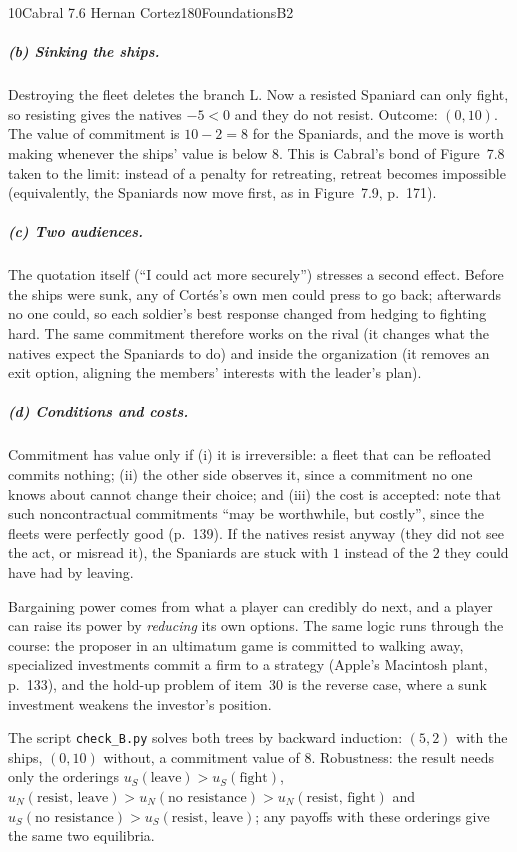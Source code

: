 \begin{exsol}{10}{Cabral 7.6 Hernan Cortez}{180}{Foundations}{B2}
\subparagraph{(b) Sinking the ships.} Destroying the fleet deletes the branch L. Now a resisted
Spaniard can only fight, so resisting gives the natives $-5 < 0$ and they do not resist.
Outcome: $(0,10)$. The value of commitment is $10 - 2 = 8$ for the Spaniards, and the move is
worth making whenever the ships' value is below $8$. This is Cabral's bond of Figure~7.8 taken to
the limit: instead of a penalty for retreating, retreat becomes impossible (equivalently, the
Spaniards now move first, as in Figure~7.9, p.~171).

\subparagraph{(c) Two audiences.} The quotation itself (``I could act more securely'') stresses
a second effect. Before the ships were sunk, any of Cort\'es's own men could press to go back;
afterwards no one could, so each soldier's best response changed from hedging to fighting
hard. The same commitment therefore works on the rival (it changes what the natives expect the
Spaniards to do) and inside the organization (it removes an exit option, aligning the members'
interests with the leader's plan).

\subparagraph{(d) Conditions and costs.} Commitment has value only if (i) it is irreversible:
a fleet that can be refloated commits nothing; (ii) the other side observes it, since a
commitment no one knows about cannot change their choice; and (iii) the cost is accepted: \MR{}
note that such noncontractual commitments ``may be worthwhile, but costly'', since the fleets
were perfectly good (p.~139). If the natives resist anyway (they did not see the act, or misread
it), the Spaniards are stuck with $1$ instead of the $2$ they could have had by leaving.

\interp Bargaining power comes from what a player can credibly do next, and a player can raise
its power by \emph{reducing} its own options. The same logic runs through the course: the
proposer in an ultimatum game is committed to walking away, specialized investments commit a
firm to a strategy (Apple's Macintosh plant, \MR{} p.~133), and the hold-up problem of item~30 is
the reverse case, where a sunk investment weakens the investor's position.

\verify The script \texttt{check\_B.py} solves both trees by backward induction: $(5,2)$ with the
ships, $(0,10)$ without, a commitment value of $8$. Robustness: the result needs only the
orderings $u_S(\text{leave}) > u_S(\text{fight})$, $u_N(\text{resist, leave}) > u_N(\text{no
resistance}) > u_N(\text{resist, fight})$ and $u_S(\text{no resistance}) >
u_S(\text{resist, leave})$; any payoffs with these orderings give the same two equilibria.

\end{exsol}
